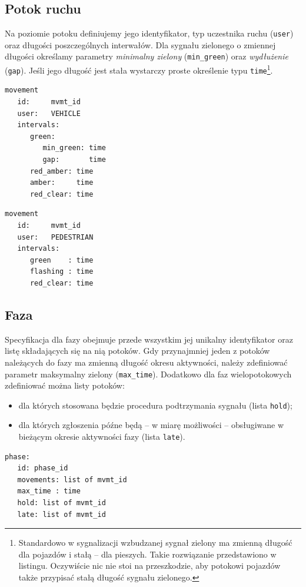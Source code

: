 \documentclass{pracamgr}
\theoremstyle{plain}
\begin{document}
\subsection{Potok ruchu}
Na poziomie potoku definiujemy jego identyfikator, typ uczestnika
ruchu (\texttt{user}) oraz długości poszczególnych interwałów.  Dla
sygnału zielonego o zmiennej długości określamy parametry
\emph{minimalny zielony} (\texttt{min\_green}) oraz \emph{wydłużenie}
(\texttt{gap}). Jeśli jego długość jest stała wystarczy proste
określenie typu \texttt{time}\footnote{Standardowo w sygnalizacji
  wzbudzanej sygnał zielony ma zmienną długość dla pojazdów i stałą --
dla pieszych. Takie rozwiązanie przedstawiono w listingu. Oczywiście
nic nie stoi na przeszkodzie, aby potokowi pojazdów także przypisać
stałą długość sygnału zielonego.}.

\noindent\begin{minipage}{1.0\linewidth}
\begin{lstlisting}[caption=Schemat opisu potoku pojazdów.]
movement
   id:     mvmt_id
   user:   VEHICLE
   intervals:
      green:
         min_green: time
         gap:       time
      red_amber: time
      amber:     time
      red_clear: time
\end{lstlisting}
\end{minipage}

\noindent\begin{minipage}{1.0\linewidth}
\begin{lstlisting}[caption=Schemat opisu dla potoku pieszych.]
movement
   id:     mvmt_id
   user:   PEDESTRIAN
   intervals:
      green    : time
      flashing : time
      red_clear: time
\end{lstlisting}
\end{minipage}

\subsection{Faza} Specyfikacja dla fazy obejmuje przede wszystkim jej
unikalny identyfikator oraz listę składających się na nią potoków.
Gdy przynajmniej jeden z potoków należących do fazy ma zmienną długość
okresu aktywności, należy zdefiniować parametr maksymalny zielony
(\texttt{max\_time}).  Dodatkowo dla faz wielopotokowych zdefiniować
można listy potoków:
\begin{itemize}
  \item dla których stosowana będzie procedura podtrzymania sygnału
  (lista \texttt{hold});
  \item dla których zgłoszenia późne będą -- w miarę możliwości --
  obsługiwane w bieżącym okresie aktywności fazy (lista \texttt{late}).
\end{itemize}
\noindent\begin{minipage}{1.0\linewidth}
\begin{lstlisting}[caption=Schemat opisu fazy.]
phase:
   id: phase_id
   movements: list of mvmt_id
   max_time : time
   hold: list of mvmt_id
   late: list of mvmt_id
\end{lstlisting}
\end{minipage}
\end{document}
